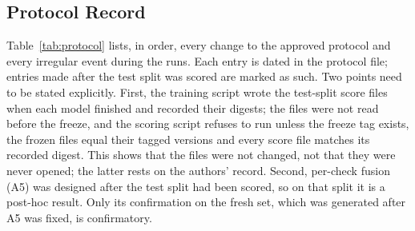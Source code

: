 \documentclass[conference]{IEEEtran}
\begin{document}
\subsection{Protocol Record}

Table~\ref{tab:protocol} lists, in order, every change to the approved
protocol and every irregular event during the runs. Each entry is dated
in the protocol file; entries made after the test split was scored are
marked as such. Two points need to be stated explicitly. First, the
training script wrote the test-split score files when each model
finished and recorded their digests; the files were not read before the
freeze, and the scoring script refuses to run unless the freeze tag
exists, the frozen files equal their tagged versions and every score
file matches its recorded digest. This shows that the files were not changed, not
that they were never opened; the latter rests on the authors' record.
Second, per-check fusion (A5) was designed after the test split had
been scored, so on that split it is a post-hoc result. Only its
confirmation on the fresh set, which was generated after A5 was fixed,
is confirmatory.
\end{document}

